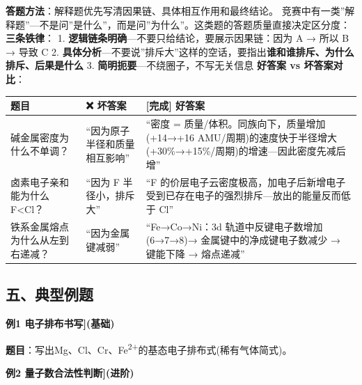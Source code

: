 \textbf{答题方法}：解释题优先写清因果链、具体相互作用和最终结论。
竞赛中有一类''解释题''---不是问''是什么''，而是问''为什么''。这类题的答题质量直接决定区分度：
\textbf{三条铁律}：
1. \textbf{逻辑链条明确}---不要只给结论，要展示因果链：因为 A → 所以 B → 导致 C
2. \textbf{具体分析}---不要说''排斥大''这样的空话，要指出\textbf{谁和谁排斥、为什么排斥、后果是什么}
3. \textbf{简明扼要}---不绕圈子，不写无关信息
\textbf{好答案 vs 坏答案对比}：

{\def\LTcaptype{none} %
\begin{longtable}[]{@{}
  >{\raggedright\arraybackslash}p{}
  >{\raggedright\arraybackslash}p{}
  >{\raggedright\arraybackslash}p{}@{}}
\toprule\noalign{}
\begin{minipage}[b]{\linewidth}\raggedright
题目
\end{minipage} & \begin{minipage}[b]{\linewidth}\raggedright
❌ 坏答案
\end{minipage} & \begin{minipage}[b]{\linewidth}\raggedright
{[}完成{]} 好答案
\end{minipage} \\
\midrule\noalign{}
\endhead
\bottomrule\noalign{}
\endlastfoot
碱金属密度为什么不单调？ & ``因为原子半径和质量相互影响'' & ``密度 = 质量/体积。同族向下，质量增加(+14→+16 AMU/周期)的速度快于半径增大(+30\%→+15\%/周期)的增速---因此密度先减后增'' \\
卤素电子亲和能为什么 F\textless Cl？ & ``因为 F 半径小，排斥大'' & ``F 的价层电子云密度极高，加电子后新增电子受到已存在电子的强烈排斥---放出的能量反而低于 Cl'' \\
铁系金属熔点为什么从左到右递减？ & ``因为金属键减弱'' & ``Fe→Co→Ni：3d 轨道中反键电子数增加(6→7→8)→ 金属键中的净成键电子数减少 → 键能下降 → 熔点递减'' \\
\end{longtable}
}

\subsection{五、典型例题}\label{ux4e94ux5178ux578bux4f8bux9898}

\textbf{例1 电子排布书写{]}(基础)}

\textbf{题目}：写出Mg、Cl、Cr、Fe\textsuperscript{2+}的基态电子排布式(稀有气体简式)。

\textbf{例2 量子数合法性判断{]}(进阶)}

